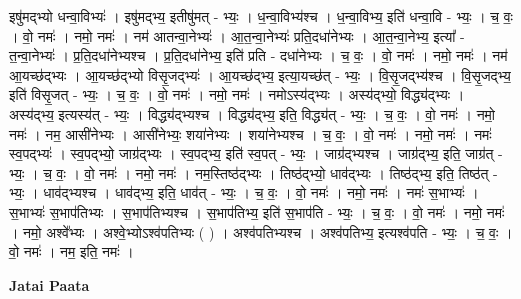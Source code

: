 \documentclass[17pt]{extarticle}
\begin{document}
इषु॑मद्भ्यो धन्वा॒विभ्यः॑ । इषु॑मद्भ्य॒ इतीषु॑मत् - भ्यः॒ । ध॒न्वा॒विभ्य॑श्च । ध॒न्वा॒विभ्य॒ इति॑ धन्वा॒वि - भ्यः॒ । च॒ वः॒ । वो॒ नमः॑ । नमो॒ नमः॑ । नम॑ आतन्वा॒नेभ्यः॑ । आ॒त॒न्वा॒नेभ्यः॑ प्रति॒दधा॑नेभ्यः । आ॒त॒न्वा॒नेभ्य॒ इत्या᳚ - त॒न्वा॒नेभ्यः॑ । प्र॒ति॒दधा॑नेभ्यश्च । प्र॒ति॒दधा॑नेभ्य॒ इति॑ प्रति - दधा॑नेभ्यः । च॒ वः॒ । वो॒ नमः॑ । नमो॒ नमः॑ । नम॑ आ॒यच्छ॑द्भ्यः । आ॒यच्छ॑द्भ्यो विसृ॒जद्भ्यः॑ । आ॒यच्छ॑द्भ्य॒ इत्या॒यच्छ॑त् - भ्यः॒ । वि॒सृ॒जद्भ्य॑श्च । वि॒सृ॒जद्भ्य॒ इति॑ विसृ॒जत् - भ्यः॒ । च॒ वः॒ । वो॒ नमः॑ । नमो॒ नमः॑ । नमोऽस्य॑द्भ्यः । अस्य॑द्भ्यो॒ विद्ध्य॑द्भ्यः । अस्य॑द्भ्य॒ इत्यस्य॑त् - भ्यः॒ । विद्ध्य॑द्भ्यश्च । विद्ध्य॑द्भ्य॒ इति॒ विद्ध्य॑त् - भ्यः॒ । च॒ वः॒ । वो॒ नमः॑ । नमो॒ नमः॑ । नम॒ आसी॑नेभ्यः । आसी॑नेभ्यः॒ शया॑नेभ्यः । शया॑नेभ्यश्च । च॒ वः॒ । वो॒ नमः॑ । नमो॒ नमः॑ । नमः॑ स्व॒पद्भ्यः॑ । स्व॒पद्भ्यो॒ जाग्र॑द्भ्यः । स्व॒पद्भ्य॒ इति॑ स्व॒पत् - भ्यः॒ । जाग्र॑द्भ्यश्च । जाग्र॑द्भ्य॒ इति॒ जाग्र॑त् - भ्यः॒ । च॒ वः॒ । वो॒ नमः॑ । नमो॒ नमः॑ । नम॒स्तिष्ठ॑द्भ्यः । तिष्ठ॑द्भ्यो॒ धाव॑द्भ्यः । तिष्ठ॑द्भ्य॒ इति॒ तिष्ठ॑त् - भ्यः॒ । धाव॑द्भ्यश्च । धाव॑द्भ्य॒ इति॒ धाव॑त् - भ्यः॒ । च॒ वः॒ । वो॒ नमः॑ । नमो॒ नमः॑ । नमः॑ स॒भाभ्यः॑ । स॒भाभ्यः॑ स॒भाप॑तिभ्यः । स॒भाप॑तिभ्यश्च । स॒भाप॑तिभ्य॒ इति॑ स॒भाप॑ति - भ्यः॒ । च॒ वः॒ । वो॒ नमः॑ । नमो॒ नमः॑ । नमो॒ अश्वे᳚भ्यः । अश्वे॒भ्योऽश्व॑पतिभ्यः ( ) । अश्व॑पतिभ्यश्च । अश्व॑पतिभ्य॒ इत्यश्व॑पति - भ्यः॒ । च॒ वः॒ । वो॒ नमः॑ । नम॒ इति॒ नमः॑ । \newline

\textbf{Jatai Paata} \newline
\end{document}
